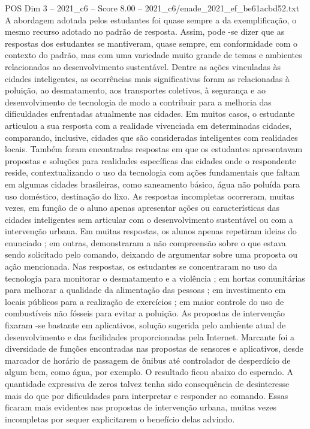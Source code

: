 \begin{textsample}{POS Dim 3 – 2021\_c6 – Score 8.00 – 2021\_c6/enade\_2021\_ef\_be61acbd52.txt}
A abordagem adotada pelos estudantes foi quase sempre a da exemplificação, o mesmo recurso adotado no padrão de resposta.
Assim, pode -se dizer que as respostas dos estudantes se mantiveram, quase sempre, em conformidade com o contexto do padrão, mas com uma variedade muito grande de temas e ambientes relacionados ao desenvolvimento sustentável.
Dentre as ações vinculadas às cidades inteligentes, as ocorrências mais significativas foram as relacionadas à poluição, ao desmatamento, aos transportes coletivos, à segurança e ao desenvolvimento de tecnologia de modo a contribuir para a melhoria das dificuldades enfrentadas atualmente nas cidades.
Em muitos casos, o estudante articulou a sua resposta com a realidade vivenciada em determinadas cidades, comparando, inclusive, cidades que são consideradas inteligentes com realidades locais.
Também foram encontradas respostas em que os estudantes apresentavam propostas e soluções para realidades específicas das cidades onde o respondente reside, contextualizando o uso da tecnologia com ações fundamentais que faltam em algumas cidades brasileiras, como saneamento básico, água não poluída para uso doméstico, destinação do lixo.
As respostas incompletas ocorreram, muitas vezes, em função de o aluno apenas apresentar ações ou características das cidades inteligentes sem articular com o desenvolvimento sustentável ou com a intervenção urbana.
Em muitas respostas, os alunos apenas repetiram ideias do enunciado ; em outras, demonstraram a não compreensão sobre o que estava sendo solicitado pelo comando, deixando de argumentar sobre uma proposta ou ação mencionada.
Nas respostas, os estudantes se concentraram no uso da tecnologia para monitorar o desmatamento e a violência ; em hortas comunitárias para melhorar a qualidade da alimentação das pessoas ; em investimento em locais públicos para a realização de exercícios ; em maior controle do uso de combustíveis não fósseis para evitar a poluição.
As propostas de intervenção fixaram -se bastante em aplicativos, solução sugerida pelo ambiente atual de desenvolvimento e das facilidades proporcionadas pela Internet.
Marcante foi a diversidade de funções encontradas nas propostas de sensores e aplicativos, desde marcador de horário de passagem de ônibus até controlador de desperdício de algum bem, como água, por exemplo.
O resultado ficou abaixo do esperado.
A quantidade expressiva de zeros talvez tenha sido consequência de desinteresse mais do que por dificuldades para interpretar e responder ao comando.
Essas ficaram mais evidentes nas propostas de intervenção urbana, muitas vezes incompletas por sequer explicitarem o benefício delas advindo.

\end{textsample}
